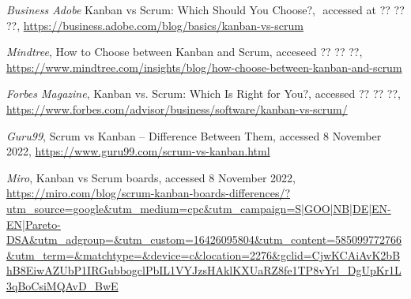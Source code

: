\begin{latin}
	\begingroup
	\renewcommand{\section}[2]{}%
	
\begin{thebibliography}{9}

	 ‌\textit{Business Adobe}
	Kanban vs Scrum: Which Should You Choose?,  ‌
	accessed at ?? ?? ??,
	\url{https://business.adobe.com/blog/basics/kanban-vs-scrum} 

	\textit{Mindtree},
	How to Choose between Kanban and Scrum, 
	acceseed ?? ?? ??,
	\url{https://www.mindtree.com/insights/blog/how-choose-between-kanban-and-scrum}

	\textit{Forbes Magazine},
	Kanban vs. Scrum: Which Is Right for You?,
	accessed ?? ?? ??, \url{https://www.forbes.com/advisor/business/software/kanban-vs-scrum/}
        
	\textit{Guru99},
	Scrum vs Kanban – Difference Between Them,
	accessed 8 November 2022,
	\url{https://www.guru99.com/scrum-vs-kanban.html}

	\textit{Miro},
	Kanban vs Scrum boards,
	accessed 8 November 2022,
	\url{https://miro.com/blog/scrum-kanban-boards-differences/?utm_source=google&utm_medium=cpc&utm_campaign=S|GOO|NB|DE|EN-EN|Pareto-DSA&utm_adgroup=&utm_custom=16426095804&utm_content=585099772766&utm_term=&matchtype=&device=c&location=2276&gclid=CjwKCAiAvK2bBhB8EiwAZUbP1IRGubbogclPbIL1VYJzsHAklKXUaRZ8fe1TP8vYrl_DgUpKr1L3qBoCsiMQAvD_BwE}
        
	
\end{thebibliography}
\endgroup
\end{latin}






